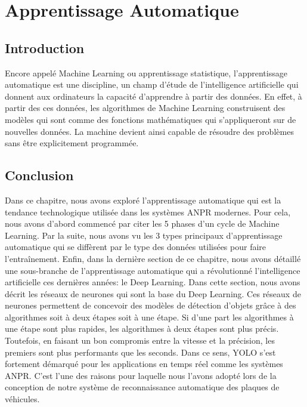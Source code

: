 \chapter{\textbf{Apprentissage Automatique}}
    \section{Introduction}
    Encore appelé Machine Learning ou apprentissage statistique, l’apprentissage automatique est une discipline, un champ d’étude de l’intelligence artificielle qui donnent aux ordinateurs la capacité d’apprendre à partir des données. En effet, à partir des ces données, les algorithmes de Machine Learning construisent des modèles qui sont comme des fonctions mathématiques qui s’appliqueront sur de nouvelles données. La machine devient ainsi capable de résoudre des problèmes sans être explicitement programmée. 
    
    
    

    \section{Conclusion}
    Dans ce chapitre, nous avons exploré l’apprentissage automatique qui est la tendance technologique utilisée dans les systèmes ANPR modernes. Pour cela, nous avons d’abord commencé par citer les 5 phases d’un cycle de Machine Learning. Par la suite, nous avons vu les 3 types principaux d’apprentissage automatique qui se diffèrent par le type des données utilisées pour faire l’entraînement. Enfin,  dans la dernière section de ce chapitre, nous avons détaillé une sous-branche de l’apprentissage automatique qui a révolutionné l’intelligence artificielle ces dernières années: le Deep Learning.  Dans cette section, nous avons décrit les réseaux de neurones qui sont la base du Deep Learning. Ces réseaux de neurones permettent de concevoir des modèles de détection d’objets grâce à des algorithmes soit à deux étapes soit à une étape. Si d’une part les algorithmes à une étape sont plus rapides, les algorithmes à deux étapes sont plus précis. Toutefois, en faisant un bon compromis entre la vitesse et la précision, les premiers sont plus performants que les seconds. Dans ce sens, YOLO s’est fortement démarqué pour les applications en temps réel comme les systèmes ANPR. C’est l’une des raisons pour laquelle nous l’avons adopté lors de la conception de notre système de reconnaissance automatique des plaques de véhicules.